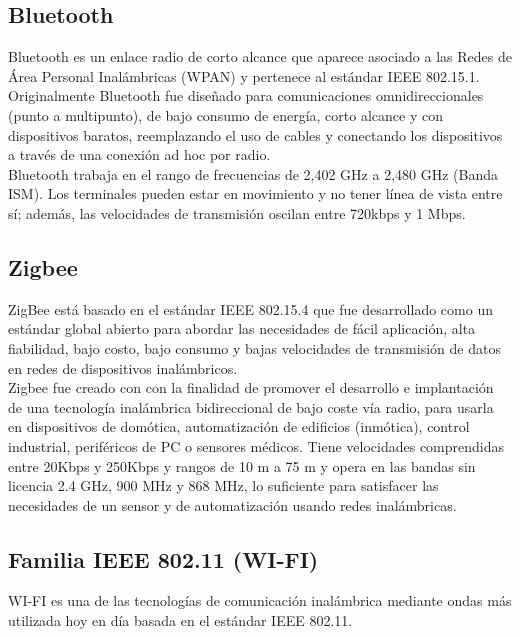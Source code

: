 		\subsection{Bluetooth}
		Bluetooth es un enlace radio de corto alcance que aparece asociado a las Redes de Área Personal Inalámbricas (WPAN) y pertenece al estándar IEEE 802.15.1. Originalmente Bluetooth fue diseñado para comunicaciones omnidireccionales (punto a multipunto), de bajo consumo de energía, corto alcance y con dispositivos baratos, reemplazando el uso de cables y conectando los dispositivos a través de una conexión ad hoc por radio. \cite{camargo2009} \cite{salazarRedes} \\
		
		Bluetooth trabaja en el rango de frecuencias de 2,402 GHz a 2,480 GHz (Banda ISM). Los terminales pueden estar en movimiento y no tener línea de vista entre sí; además, las velocidades de transmisión oscilan entre 720kbps y 1 Mbps. 
	
		\subsection{Zigbee}
		ZigBee está basado en el estándar IEEE 802.15.4 que fue desarrollado como un estándar global abierto para abordar las necesidades de fácil aplicación, alta fiabilidad, bajo costo, bajo consumo y bajas velocidades de transmisión de datos en redes de dispositivos inalámbricos. \cite{salazarRedes} \\
		
		Zigbee fue creado con  con la finalidad de promover el desarrollo e implantación de una tecnología inalámbrica bidireccional de bajo coste vía radio, para usarla en dispositivos de domótica, automatización de edificios (inmótica), control industrial, periféricos de PC o sensores médicos.  Tiene velocidades comprendidas entre 20Kbps y 250Kbps y rangos de 10 m a 75 m y opera en las bandas sin licencia 2.4 GHz, 900 MHz y 868 MHz, lo suficiente para satisfacer las necesidades de un sensor y de automatización usando redes inalámbricas. \cite{camargo2009}
	
		\subsection{Familia IEEE 802.11 (WI-FI)}
		WI-FI es una de las tecnologías de comunicación inalámbrica mediante ondas más utilizada hoy en día basada en el estándar IEEE 802.11. \cite{wifi}
		
